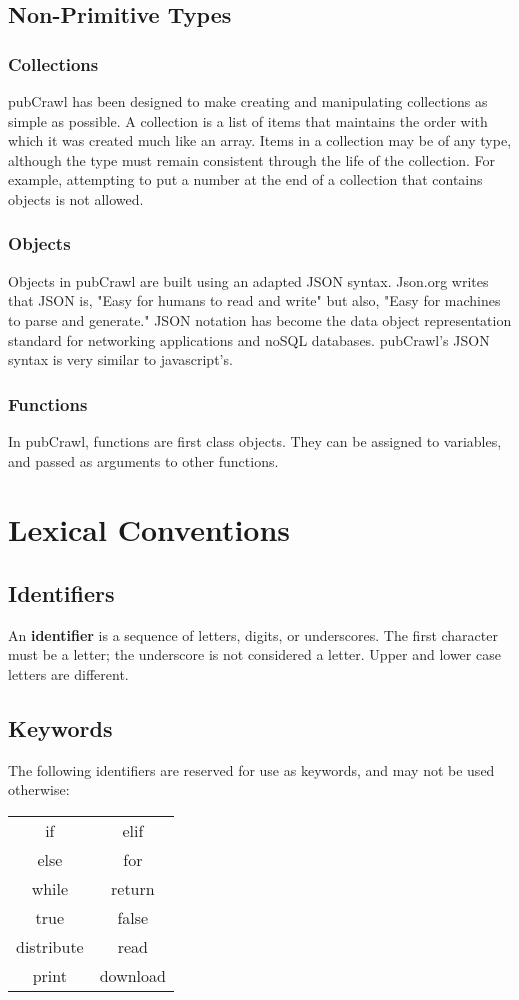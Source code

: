 \documentclass[oneside]{book}
\begin{document}
\subsection{Non-Primitive Types}

\subsubsection{Collections}
pubCrawl has been designed to make creating and manipulating collections as simple as possible. A collection is a list of items that maintains the order with which it was created much like an array. Items in a collection may be of any type, although the type must remain consistent through the life of the collection. For example, attempting to put a number at the end of a collection that contains objects is not allowed.

\subsubsection{Objects}
Objects in pubCrawl are built using an adapted JSON syntax. Json.org writes that JSON is, "Easy for humans to read and write" but also, "Easy for machines to parse and generate." JSON notation has become the data object representation standard for networking applications and noSQL databases. pubCrawl's JSON syntax is very similar to javascript's.

\subsubsection{Functions}
In pubCrawl, functions are first class objects. They can be assigned to variables, and passed as arguments to other functions.


\section{Lexical Conventions}
\subsection{Identifiers}
An \textbf{identifier} is a sequence of letters, digits, or underscores. The first character must be a letter; the underscore is not considered a letter. Upper and lower case letters are different.
\subsection{Keywords}
The following identifiers are reserved for use as keywords, and may not be used otherwise:\\
\begin{center}
  \begin{tabular}{c c}
  if&elif\\
  else&for\\
  while&return\\
  true&false\\
  distribute&read\\
  print&download
  \end{tabular}
\end{center}
\end{document}
